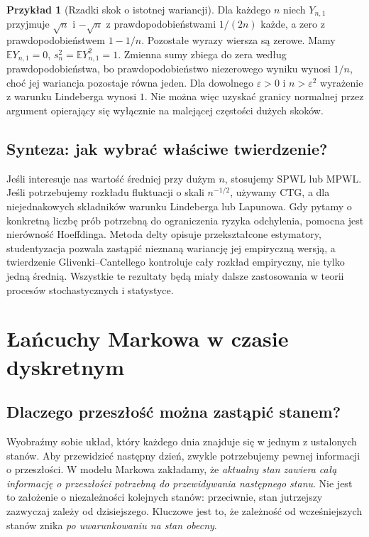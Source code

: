\documentclass[11pt,a4paper,oneside]{report}
\numberwithin{equation}{chapter}
\theoremstyle{plain}
\theoremstyle{definition}
\newtheorem{przyklad}{Przykład}[chapter]
\theoremstyle{remark}
\newcommand{\E}{\mathbb{E}}
\begin{document}
\begin{przyklad}[Rzadki skok o istotnej wariancji]
Dla każdego $n$ niech $Y_{n,1}$ przyjmuje $\sqrt n$
i $-\sqrt n$ z prawdopodobieństwami $1/(2n)$
każde, a zero z prawdopodobieństwem $1-1/n$.
Pozostałe wyrazy wiersza są zerowe. Mamy
$\E Y_{n,1}=0$, $s_n^2=\E Y_{n,1}^2=1$.
Zmienna sumy zbiega do zera według prawdopodobieństwa,
bo prawdopodobieństwo niezerowego wyniku wynosi $1/n$,
choć jej wariancja pozostaje równa jeden.
Dla dowolnego $\varepsilon>0$ i $n>\varepsilon^2$
wyrażenie z warunku Lindeberga wynosi $1$.
Nie można więc uzyskać granicy normalnej przez
argument opierający się wyłącznie na malejącej
częstości dużych skoków.
\end{przyklad}

\section{Synteza: jak wybrać właściwe twierdzenie?}

Jeśli interesuje nas wartość średniej przy dużym $n$,
stosujemy SPWL lub MPWL. Jeśli potrzebujemy rozkładu
fluktuacji o skali $n^{-1/2}$, używamy CTG, a dla
niejednakowych składników warunku Lindeberga lub
Lapunowa. Gdy pytamy o konkretną liczbę prób potrzebną
do ograniczenia ryzyka odchylenia, pomocna jest
nierówność Hoeffdinga. Metoda delty opisuje
przekształcone estymatory, studentyzacja pozwala
zastąpić nieznaną wariancję jej empiryczną wersją,
a twierdzenie Glivenki--Cantellego kontroluje
cały rozkład empiryczny, nie tylko jedną średnią.
Wszystkie te rezultaty będą miały dalsze zastosowania
w teorii procesów stochastycznych i statystyce.

\chapter{Łańcuchy Markowa w czasie dyskretnym}
\label{ch:markov}

\section{Dlaczego przeszłość można zastąpić stanem?}

Wyobraźmy sobie układ, który każdego dnia znajduje się w jednym
z ustalonych stanów. Aby przewidzieć następny dzień, zwykle
potrzebujemy pewnej informacji o przeszłości. W modelu Markowa
zakładamy, że \emph{aktualny stan zawiera całą informację o
przeszłości potrzebną do przewidywania następnego stanu}.
Nie jest to założenie o niezależności kolejnych stanów: przeciwnie,
stan jutrzejszy zazwyczaj zależy od dzisiejszego. Kluczowe jest
to, że zależność od wcześniejszych stanów znika \emph{po
uwarunkowaniu na stan obecny}.
\end{document}
